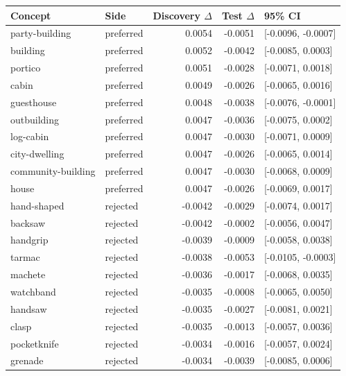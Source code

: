 \begin{tabular}{llrrl}
\toprule
Concept & Side & Discovery $\Delta$ & Test $\Delta$ & 95\% CI \\
\midrule
party-building & preferred & 0.0054 & -0.0051 & [-0.0096, -0.0007] \\
building & preferred & 0.0052 & -0.0042 & [-0.0085, 0.0003] \\
portico & preferred & 0.0051 & -0.0028 & [-0.0071, 0.0018] \\
cabin & preferred & 0.0049 & -0.0026 & [-0.0065, 0.0016] \\
guesthouse & preferred & 0.0048 & -0.0038 & [-0.0076, -0.0001] \\
outbuilding & preferred & 0.0047 & -0.0036 & [-0.0075, 0.0002] \\
log-cabin & preferred & 0.0047 & -0.0030 & [-0.0071, 0.0009] \\
city-dwelling & preferred & 0.0047 & -0.0026 & [-0.0065, 0.0014] \\
community-building & preferred & 0.0047 & -0.0030 & [-0.0068, 0.0009] \\
house & preferred & 0.0047 & -0.0026 & [-0.0069, 0.0017] \\
hand-shaped & rejected & -0.0042 & -0.0029 & [-0.0074, 0.0017] \\
backsaw & rejected & -0.0042 & -0.0002 & [-0.0056, 0.0047] \\
handgrip & rejected & -0.0039 & -0.0009 & [-0.0058, 0.0038] \\
tarmac & rejected & -0.0038 & -0.0053 & [-0.0105, -0.0003] \\
machete & rejected & -0.0036 & -0.0017 & [-0.0068, 0.0035] \\
watchband & rejected & -0.0035 & -0.0008 & [-0.0065, 0.0050] \\
handsaw & rejected & -0.0035 & -0.0027 & [-0.0081, 0.0021] \\
clasp & rejected & -0.0035 & -0.0013 & [-0.0057, 0.0036] \\
pocketknife & rejected & -0.0034 & -0.0016 & [-0.0057, 0.0024] \\
grenade & rejected & -0.0034 & -0.0039 & [-0.0085, 0.0006] \\
\bottomrule
\end{tabular}
